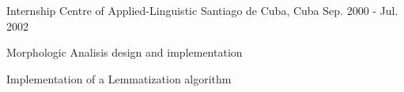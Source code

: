 \begin{cventries}

\cventry
{Internship} %
{Centre of Applied-Linguistic} %
{Santiago de Cuba, Cuba} %
{Sep. 2000 - Jul. 2002} %
{ %
\begin{cvitems}
\item {Morphologic Analisis design and implementation}
\item {Implementation of a Lemmatization algorithm}
\end{cvitems}
}


\end{cventries}


